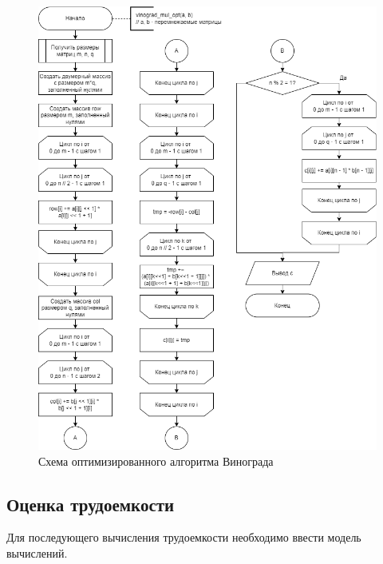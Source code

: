 \begin{figure}[h!btp]
	\centering
	\includegraphics[width=450pt]{inc/diagram-vinograd-opt.png}
	\caption{Схема оптимизированного алгоритма Винограда}
	\label{fig:diagram-vinograd-opt}	
\end{figure}
\clearpage

\subsection{Оценка трудоемкости}

Для последующего вычисления трудоемкости необходимо ввести модель вычислений.

